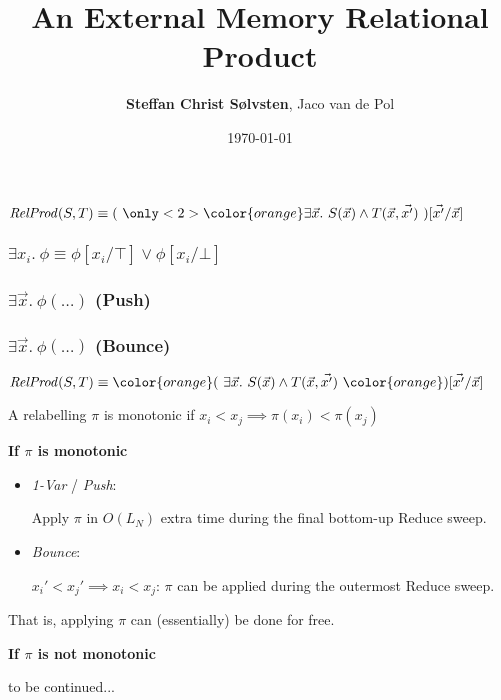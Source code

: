 \documentclass[english, aspectratio=169]{beamer}
\title{An External Memory Relational Product}
\author{\textbf{Steffan Christ S\o lvsten}, Jaco van de Pol}
\institute{\texttt{[image: ../external/aulogo\_uk\_var2\_black.eps]}}
\date{\today}
\begin{document}
\titleframe

\begin{frame}
  \begin{center}
    \LARGE

    $\mathit{RelProd}(S,T)
    \equiv
    (
    \ {\only<2>{\color{orange}} \exists \vec{x} .}\
    S(\vec{x}) \wedge T(\vec{x}, \vec{x'})
    \ ) [\vec{x'} / \vec{x}]$
  \end{center}
\end{frame}

\begin{frame}
  \frametitle{$\exists x_i .\ \phi \equiv \phi[x_i / \top] \vee \phi[x_i / \bot]$}

  
\end{frame}

\blankframe

\begin{frame}
  \frametitle{$\exists \vec{x}.\ \phi(\dots)$ \quad (Push)}

  
\end{frame}

\blankframe

\begin{frame}
  \frametitle{$\exists \vec{x}.\ \phi(\dots)$ \quad (Bounce)}

  
\end{frame}

\blankframe

\begin{frame}
  \begin{center}
    \LARGE

    $\mathit{RelProd}(S,T)
    \equiv
    {\color{orange} (}
    \ \exists \vec{x} .\
    S(\vec{x}) \wedge T(\vec{x}, \vec{x'})
    \ {\color{orange} ) [\vec{x'} / \vec{x}]}$
  \end{center}
\end{frame}

\begin{frame}
  \begin{definition}
    A relabelling $\pi$ is monotonic if $x_i < x_j \implies \pi(x_i) < \pi(x_j)$
  \end{definition}

  \pause
  {\bf If $\pi$ is monotonic}

  \begin{itemize}
  \item \emph{1-Var} / \emph{Push}:

    Apply $\pi$ in $O(L_N)$ extra time during the final bottom-up Reduce
    sweep.

  \item \emph{Bounce}:

    $x_i' < x_j' \implies x_i < x_j$: $\pi$ can be applied during the
    outermost Reduce sweep.
  \end{itemize}

  \quad That is, applying $\pi$ can (essentially) be done for free.

  \pause
  {\bf If $\pi$ is not monotonic}

  \quad to be continued...
\end{frame}
\end{document}
